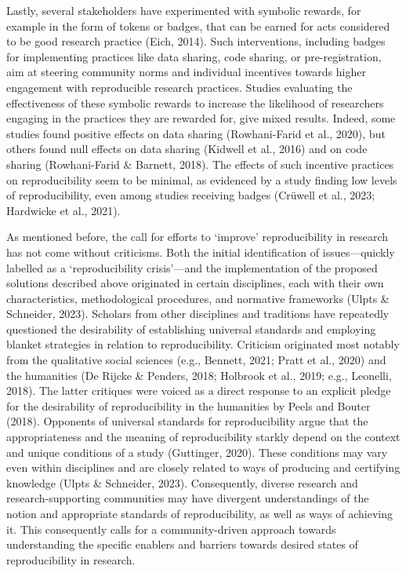 \documentclass[authordate, meta]{jote-new-article}
\begin{document}
	Lastly, several stakeholders have experimented with symbolic rewards, for example in the form of tokens or badges, that can be earned for acts considered to be good research practice (Eich, 2014). Such interventions, including badges for implementing practices like data sharing, code sharing, or pre-registration, aim at steering community norms and individual incentives towards higher engagement with reproducible research practices. Studies evaluating the effectiveness of these symbolic rewards to increase the likelihood of researchers engaging in the practices they are rewarded for, give mixed results. Indeed, some studies found positive effects on data sharing (Rowhani-Farid et al., 2020), but others found null effects on data sharing (Kidwell et al., 2016) and on code sharing (Rowhani-Farid \& Barnett, 2018). The effects of such incentive practices on reproducibility seem to be minimal, as evidenced by a study finding low levels of reproducibility, even among studies receiving badges (Crüwell et al., 2023; Hardwicke et al., 2021).



	As mentioned before, the call for efforts to ‘improve' reproducibility in research has not come without criticisms. Both the initial identification of issues—quickly labelled as a ‘reproducibility crisis'—and the implementation of the proposed solutions described above originated in certain disciplines, each with their own characteristics, methodological procedures, and normative frameworks (Ulpts \& Schneider, 2023). Scholars from other disciplines and traditions have repeatedly questioned the desirability of establishing universal standards and employing blanket strategies in relation to reproducibility. Criticism originated most notably from the qualitative social sciences (e.g., Bennett, 2021; Pratt et al., 2020) and the humanities (De Rijcke \& Penders, 2018; Holbrook et al., 2019; e.g., Leonelli, 2018). The latter critiques were voiced as a direct response to an explicit pledge for the desirability of reproducibility in the humanities by Peels and Bouter (2018). Opponents of universal standards for reproducibility argue that the appropriateness and the meaning of reproducibility starkly depend on the context and unique conditions of a study (Guttinger, 2020). These conditions may vary even within disciplines and are closely related to ways of producing and certifying knowledge (Ulpts \& Schneider, 2023). Consequently, diverse research and research-supporting communities may have divergent understandings of the notion and appropriate standards of reproducibility, as well as ways of achieving it. This consequently calls for a community-driven approach towards understanding the specific enablers and barriers towards desired states of reproducibility in research.
\end{document}
